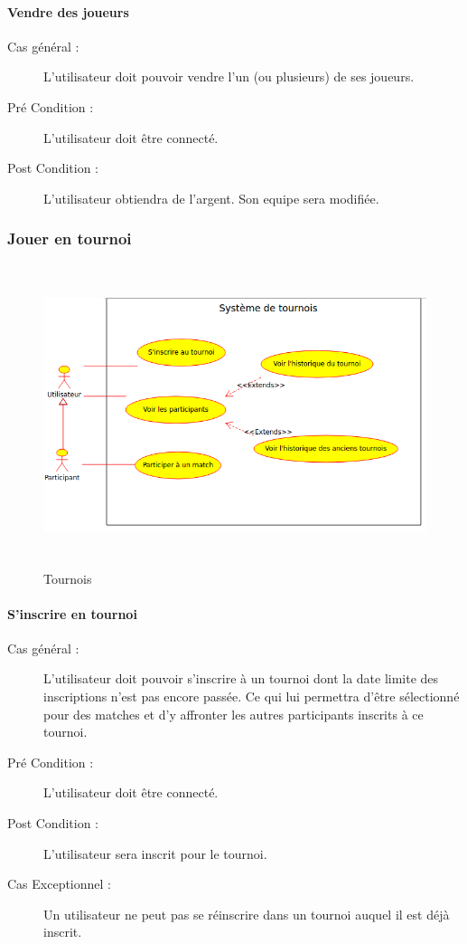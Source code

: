 \documentclass[a4paper]{article}
\begin{document}
\paragraph{Vendre des \glspl{joueur}}
\begin{description}
    \item[Cas général :] L'\gls{utilisateur} doit pouvoir vendre l'un (ou plusieurs) de ses \glspl{joueur}.
    \item[Pré Condition  :] L'\gls{utilisateur} doit être connecté.
    \item[Post Condition :] L'\gls{utilisateur} obtiendra de l'argent. Son \gls{equipe} sera modifiée.
\end{description}

\subsubsection{Jouer en tournoi}
\begin{figure}[h]
   \caption{\label{1} Tournois}
   \begin{center}
   \includegraphics[height=250pt]{uml/usrTournoi.png}
   \end{center}
\end{figure}
\paragraph{S'inscrire en tournoi}
\begin{description}
\item[Cas général :] L'\gls{utilisateur} doit pouvoir s'inscrire à un tournoi dont la date limite des inscriptions n'est pas encore passée.
Ce qui lui permettra d'être sélectionné pour des matches et d'y affronter les autres \glspl{participant} inscrits à ce tournoi.
\item[Pré Condition  :] L'\gls{utilisateur} doit être connecté.
\item[Post Condition :] L'\gls{utilisateur} sera inscrit pour le tournoi.
\item[Cas Exceptionnel :] Un \gls{utilisateur} ne peut pas se réinscrire dans un tournoi auquel il est déjà inscrit.
\end{description} 
\end{document}
